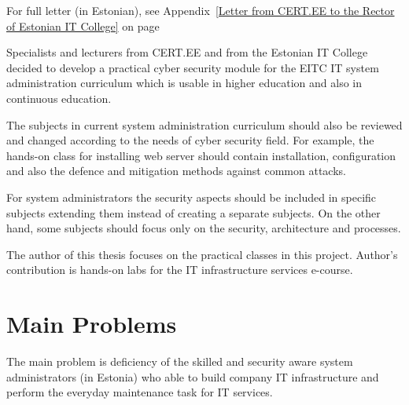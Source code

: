For full letter (in Estonian), see Appendix~\ref{Letter from CERT.EE to the Rector of Estonian IT College} on page ~\pageref{Letter from CERT.EE to the Rector of Estonian IT College}

Specialists and lecturers from \gls{CERT.EE} and from the Estonian IT College decided to develop a practical cyber security module for the \gls{EITC} IT system administration curriculum which is usable in higher education and also in continuous education.

The subjects in current system administration curriculum should also be reviewed and changed according to the needs of cyber security field. For example, the hands-on class for installing web server should contain installation, configuration and also the defence and mitigation methods against common attacks. 

For system administrators the security aspects should be included in specific subjects extending them instead of creating a separate subjects. On the other hand, some subjects should focus only on the security, architecture and processes.

The author of this thesis focuses on the practical classes in this project. Author's contribution is hands-on labs for the IT infrastructure services e-course.

\section{Main Problems}
The main problem is deficiency of the skilled and security aware system administrators (in Estonia) who able to build company IT infrastructure and perform the everyday maintenance task for IT services.

